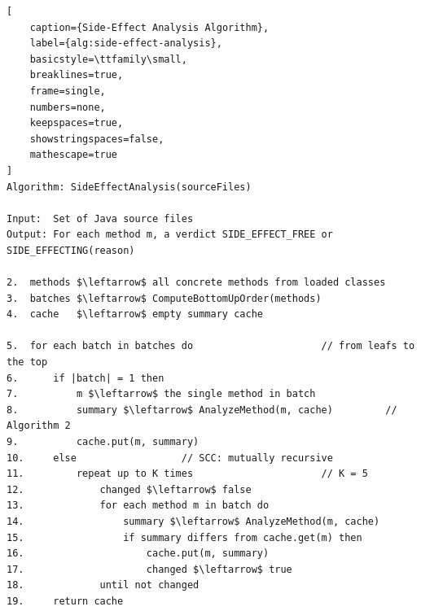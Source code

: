 

\begin{lstlisting}[
    caption={Side-Effect Analysis Algorithm}, 
    label={alg:side-effect-analysis},
    basicstyle=\ttfamily\small,
    breaklines=true,
    frame=single,
    numbers=none,
    keepspaces=true,
    showstringspaces=false,
    mathescape=true
]
Algorithm: SideEffectAnalysis(sourceFiles)

Input:  Set of Java source files
Output: For each method m, a verdict SIDE_EFFECT_FREE or SIDE_EFFECTING(reason)

2.  methods $\leftarrow$ all concrete methods from loaded classes
3.  batches $\leftarrow$ ComputeBottomUpOrder(methods)          
4.  cache   $\leftarrow$ empty summary cache

5.  for each batch in batches do                      // from leafs to the top
6.      if |batch| = 1 then
7.          m $\leftarrow$ the single method in batch
8.          summary $\leftarrow$ AnalyzeMethod(m, cache)         // Algorithm 2
9.          cache.put(m, summary)
10.     else                  // SCC: mutually recursive
11.         repeat up to K times                      // K = 5
12.             changed $\leftarrow$ false
13.             for each method m in batch do
14.                 summary $\leftarrow$ AnalyzeMethod(m, cache)
15.                 if summary differs from cache.get(m) then
16.                     cache.put(m, summary)
17.                     changed $\leftarrow$ true
18.             until not changed
19.     return cache
\end{lstlisting}


